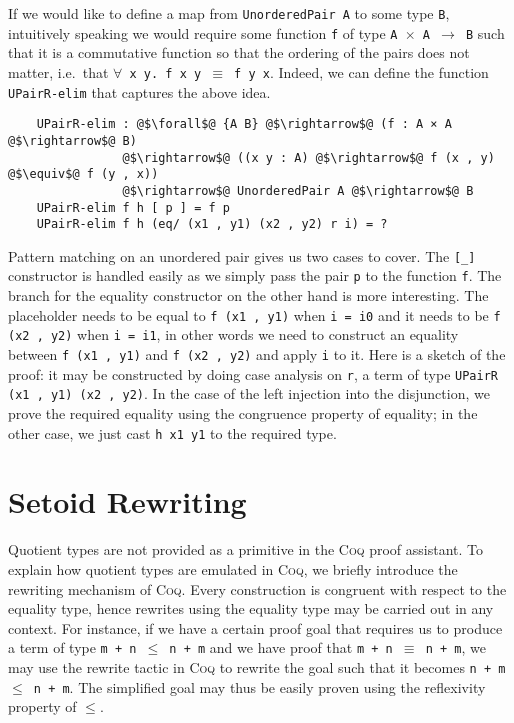 \documentclass[12pt,twoside,maitrise]{dms}
\theoremstyle{definition}
\numberwithin{equation}{section}
\numberwithin{table}{chapter}
\numberwithin{figure}{chapter}
\newcommand\kw[1] {\textsf{#1}}
\newcommand\id[1] {\texttt{#1}}
\newcommand\fn[1] {\texttt{#1}}
\def\Coq{\textsc{Coq}\xspace}
\begin{document}
If we would like to define a map from \fn{UnorderedPair A} to some type \id{B},
intuitively speaking we would require some function \id{f} of type \fn{A
  $\times$ A $\rightarrow$ B} such that it is a commutative function so that the
ordering of the pairs does not matter, i.e.\ that \fn{$\forall$ x y. f x y
  $\equiv$ f y x}. Indeed, we can define the function \id{UPairR-elim} that
captures the above idea.

\begin{verbatim}
    UPairR-elim : @$\forall$@ {A B} @$\rightarrow$@ (f : A × A @$\rightarrow$@ B)
                @$\rightarrow$@ ((x y : A) @$\rightarrow$@ f (x , y) @$\equiv$@ f (y , x))
                @$\rightarrow$@ UnorderedPair A @$\rightarrow$@ B
    UPairR-elim f h [ p ] = f p
    UPairR-elim f h (eq/ (x1 , y1) (x2 , y2) r i) = ?
\end{verbatim}

Pattern matching on an unordered pair gives us two cases to cover. The \id{[\_]}
constructor is handled easily as we simply pass the pair \id{p} to the function
\id{f}. The branch for the equality constructor on the other hand is more
interesting. The placeholder needs to be equal to \fn{f (x1 , y1)} when \fn{i =
  i0} and it needs to be \fn{f (x2 , y2)} when \fn{i = i1}, in other words we
need to construct an equality between \fn{f (x1 , y1)} and \fn{f (x2 , y2)} and
apply \id{i} to it. Here is a sketch of the proof: it may be constructed by
doing case analysis on \id{r}, a term of type \fn{UPairR (x1 , y1) (x2 , y2)}.
In the case of the left injection into the disjunction, we prove the required
equality using the congruence property of equality; in the other case, we just
cast \fn{h x1 y1} to the required type.

\section{Setoid Rewriting}

Quotient types are not provided as a primitive in the \Coq{} proof assistant. To
explain how quotient types are emulated in \Coq{}, we briefly introduce the
rewriting mechanism of \Coq{}. Every construction is congruent with respect to
the equality type, hence rewrites using the equality type may be carried out in
any context. For instance, if we have a certain proof goal that requires us to
produce a term of type \fn{m + n $\le$ n + m} and we have proof that \fn{m + n
  $\equiv$ n + m}, we may use the \kw{rewrite} tactic in \Coq{} to rewrite the
goal such that it becomes \fn{n + m $\le$ n + m}. The simplified goal may thus
be easily proven using the reflexivity property of $\le$.
\end{document}
